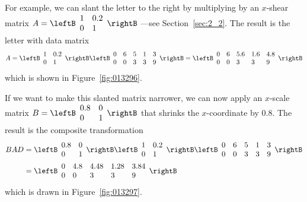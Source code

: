 For example, we can slant the letter to the right by multiplying by an $x$-shear matrix $A = \leftB
\begin{array}{ll}
1 & 0.2\\
0 & 1\\
\end{array}
\rightB$
 ---see Section~\ref{sec:2_2}. The result is the letter with data matrix
\begin{equation*}
A = \leftB
\begin{array}{ll}
1 & 0.2\\
0 & 1
\end{array}
\rightB \leftB
\begin{array}{rrrrr}
0 & 6 & 5 & 1 & 3\\
0 & 0 & 3 & 3 & 9
\end{array}
\rightB = 
 \leftB
\begin{array}{lllll}
0 & 6 & 5.6 & 1.6 & 4.8\\
0 & 0 & 3 & 3 & 9
\end{array}
\rightB
\end{equation*}
which is shown in Figure~\ref{fig:013296}.

If we want to make this slanted matrix narrower, we can now apply an $x$-scale matrix $B = \leftB
\begin{array}{ll}
	0.8 & 0\\
	0 & 1
\end{array}
\rightB$ that shrinks the $x$-coordinate by $0.8$. The result is the composite transformation
\begin{align*}
BAD &= \leftB
\begin{array}{ll}
0.8 & 0\\
0 & 1
\end{array}
\rightB \leftB
\begin{array}{ll}
1 & 0.2\\
0 & 1
\end{array}
\rightB \leftB
\begin{array}{rrrrr}
0 & 6 & 5 & 1 & 3\\
0 & 0 & 3 & 3 & 9
\end{array}
\rightB \\ &= 
\leftB
\begin{array}{lllll}
0 & 4.8 & 4.48 & 1.28 & 3.84\\
0 & 0 & 3 & 3 & 9
\end{array}
\rightB
\end{align*}
which is drawn in Figure~\ref{fig:013297}.

